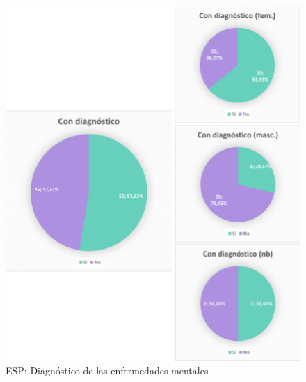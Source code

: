 \documentclass[12pt, a4paper,twoside,titlepage]{book}
\begin{document}
\begin{figure}
    \centering
    \includegraphics[width=1\linewidth]{ANEXO ESP/21AnexESPDiag}
    \caption{ESP: Diagnóstico de las enfermedades mentales}
    \label{fig:ESPDiag}
\end{figure}
\end{document}
